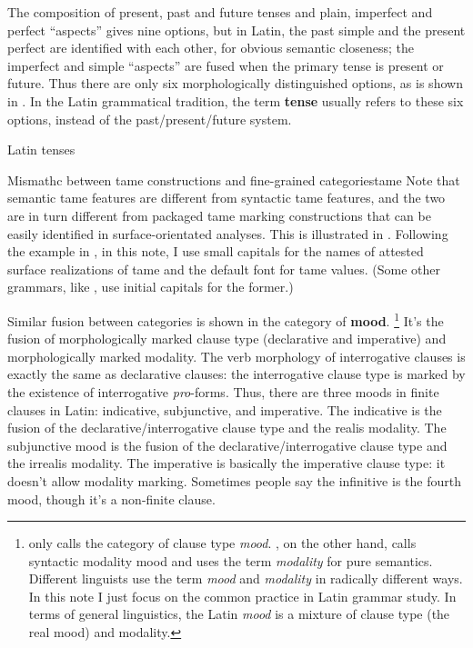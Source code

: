 \documentclass[a4paper, oneside, 12pt]{report}
\newcommand*{\concept}[1]{\textbf{#1}}
\newcommand*{\term}[1]{\emph{#1}}
\begin{document}
The composition of present, past and future tenses
and plain, imperfect and perfect ``aspects''
gives nine options,
but in Latin, 
the past simple and the present perfect are identified with each other,
for obvious semantic closeness;
the imperfect and simple ``aspects'' are fused 
when the primary tense is present or future.
Thus there are only six morphologically distinguished options,
as is shown in . 
In the Latin grammatical tradition, 
the term \concept{tense} 
usually refers to these six options,
instead of the past/present/future system.


\begin{table}[H]
    \caption{Latin tenses}
    \label{tbl:latin-tense-aspect}
    \centering
        
\end{table}

\begin{infobox}{Mismathc between \ac{tame} constructions and fine-grained categories}{tame}
    Note that semantic \ac{tame} features are different from 
    syntactic \ac{tame} features,
    and the two are in turn different from packaged \ac{tame} marking constructions
    that can be easily identified in surface-orientated analyses.
    This is illustrated in .
    Following the example in \citet{grimm2021grammar},
    in this note, I use small capitals for the names of attested surface realizations of \ac{tame}
    and the default font for \ac{tame} values.
    (Some other grammars, like \citet{jacques2021grammar,friesen2017grammar}, 
    use initial capitals for the former.)
\end{infobox}

Similar fusion between categories is shown in the category of \concept{mood}.%
\footnote{
    \citet{dixon2009basic1} only calls the category of clause type \term{mood}.
    \citet{cgel}, on the other hand, 
    calls syntactic modality mood 
    and uses the term \term{modality} for pure semantics.
    Different linguists use the term \term{mood} and \term{modality} in radically different ways.
    In this note I just focus on the common practice in Latin grammar study.
    In terms of general linguistics, 
    the Latin \term{mood} is a mixture of clause type (the real mood)
    and modality.
}
It's the fusion of morphologically marked clause type 
(declarative and imperative)
and morphologically marked modality.
The verb morphology of interrogative clauses is exactly the same as declarative clauses:
the interrogative clause type is marked by the existence of interrogative \term{pro}-forms.
Thus, there are three moods in finite clauses in Latin:
\acl{indicative}, \acl{subjunctive}, and \acl{imperative}.
The \acl{indicative} is the fusion of 
the declarative/interrogative clause type and the realis modality.
The \acl{subjunctive} mood is the fusion of 
the declarative/interrogative clause type and the irrealis modality.
The \acl{imperative} is basically the imperative clause type:
it doesn't allow modality marking.
Sometimes people say the infinitive is the fourth mood,
though it's a non-finite clause.
\end{document}
